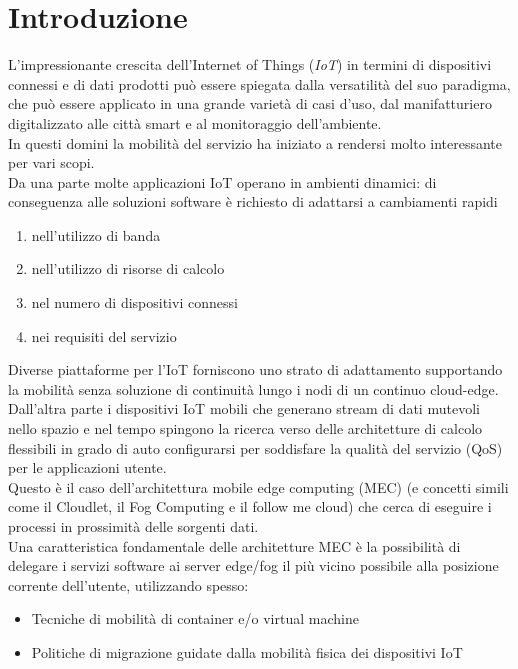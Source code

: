 \documentclass[11pt]{article}
\begin{document}
	\pagebreak
	
	\section{Introduzione}



	L'impressionante crescita dell'Internet of Things (\textit{IoT}) in termini di dispositivi connessi e di dati prodotti può essere spiegata dalla versatilità del suo paradigma, che può essere applicato in una grande varietà di casi d'uso, dal manifatturiero digitalizzato alle città smart e al monitoraggio dell'ambiente. \\
	
	In questi domini la mobilità del servizio ha iniziato a rendersi molto interessante per vari scopi. \\
	
	Da una parte molte applicazioni IoT operano in ambienti dinamici: di conseguenza alle soluzioni software è richiesto di adattarsi a cambiamenti rapidi
	\begin{enumerate}
		\item nell'utilizzo di banda
		\item nell'utilizzo di risorse di calcolo
		\item nel numero di dispositivi connessi
		\item nei requisiti del servizio
	\end{enumerate}
 	Diverse piattaforme per l'IoT forniscono uno strato di adattamento supportando la mobilità senza soluzione di continuità lungo i nodi di un continuo cloud-edge.
 	\\
 	
 	Dall'altra parte i dispositivi IoT mobili che generano stream di dati mutevoli nello spazio e nel tempo spingono la ricerca verso delle architetture di calcolo flessibili in grado di auto configurarsi per soddisfare la qualità del servizio (QoS) per le applicazioni utente.
 	\\
 	
 	Questo è il caso dell'architettura mobile edge computing (MEC)  (e concetti simili come il Cloudlet, il Fog Computing e il follow me cloud) che cerca di eseguire i processi in prossimità delle sorgenti dati.
 	\\
 	Una caratteristica fondamentale delle architetture MEC è la possibilità di delegare i servizi software ai server edge/fog il più vicino possibile alla posizione corrente dell'utente, utilizzando spesso:
 	\begin{itemize}
 		\item Tecniche di mobilità di container e/o virtual machine
 		\item Politiche di migrazione guidate dalla mobilità fisica dei dispositivi IoT
 	\end{itemize}
  
\end{document}
